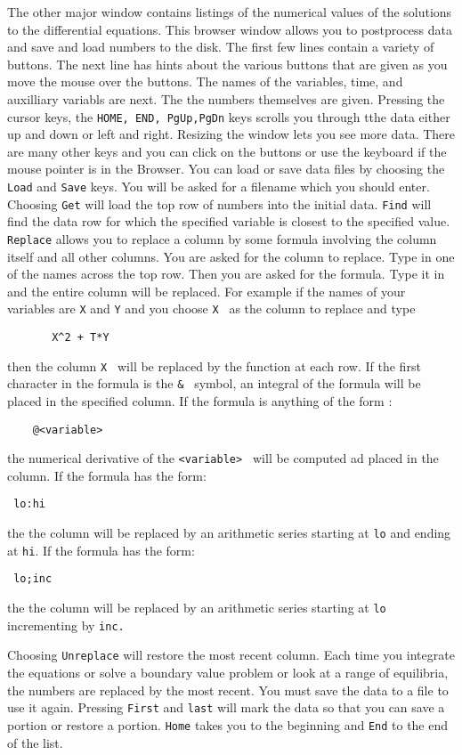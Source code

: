\documentclass{article}
\newcommand{\bvb}{\begin{verbatim}}
\begin{document}
The other major window contains listings of the numerical values of the solutions
to the differential equations.
 This browser window allows you to postprocess
 data and save and load numbers to the disk.
The first few lines contain a variety
of buttons.  The next line has hints about the various buttons that
are given as you move the mouse over the buttons. The names of the
variables, time, and auxilliary variabls are next.  The the numbers
themselves are given.
  Pressing the cursor keys, the
 {\tt HOME, END, PgUp,PgDn}  keys scrolls you through tthe data either up and down or
 left and right.  Resizing the window lets you see more data.  There are many
 other keys and you can click on the buttons or use the keyboard if the mouse
 pointer is in the Browser.  You can load or save data files by choosing the
{\tt Load}  and {\tt Save}  keys.  You will be asked for a filename which you should enter.
  Choosing {\tt Get} will load the top row of numbers into the initial data.
 {\tt Find} will find the data row for which the specified variable is closest to
 the specified value.   {\tt Replace} allows you to replace a column by some formula
involving the column itself and all other columns.  You are asked for the column
to replace.  Type in one of the names across the top row.  Then you are asked
for the formula.  Type it in and the entire column will be replaced.  For example
if the names of your variables are {\tt X}  and { \tt Y}  and you
choose {\tt X } as the column
 to replace and type
\bvb
       X^2 + T*Y
\end{verbatim}
then the column {\tt X } will be replaced by the function at each row.  If the first
character in the formula is the {\tt \& } symbol, an integral of the formula will be
 placed in the specified column.  If the formula is anything of the form :
\bvb
	@<variable>
\end{verbatim}
the numerical derivative of the {\tt <variable> } will be computed ad placed in the
 column.
If the formula has the form:
\bvb
 lo:hi
\end{verbatim}
the the column will be replaced by an arithmetic series starting at
{\tt lo} and ending at {\tt hi}.
If the formula has the form:
\bvb
 lo;inc
\end{verbatim}
the the column will be replaced by an arithmetic series starting at
{\tt lo} incrementing by {\tt inc.}

Choosing {\tt Unreplace} will restore the most recent column.  Each time you integrate
 the equations or solve a boundary value problem or look at a range of equilibria,
the numbers are replaced by the most recent.  You must save the data to a
 file to use it again.  Pressing {\tt First}  and {\tt last} will mark the data so that you
can save a portion or restore a portion.  {\tt Home} takes you to the beginning and
 {\tt End} to the end of the list.
\end{document}
